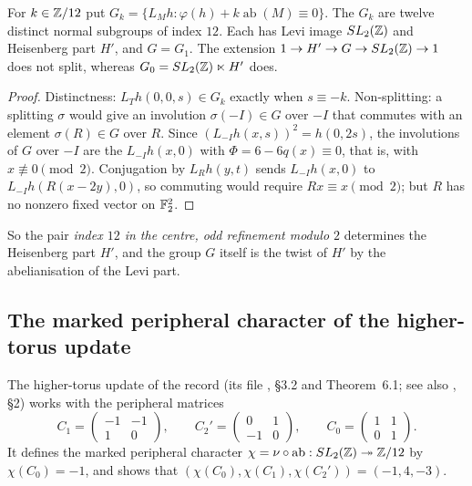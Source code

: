\begin{proposition}\label{prop:twist}
For $k\in\mathbb{Z}/12$ put $G_k=\{L_Mh:\varphi(h)+k\operatorname{ab}(M)\equiv0\}$. The $G_k$ are twelve distinct normal subgroups of index $12$. Each has Levi image $SL_2(\mathbb{Z})$ and Heisenberg part $H'$, and $G=G_1$. The extension $1\to H'\to G\to SL_2(\mathbb{Z})\to1$ does not split, whereas $G_0=SL_2(\mathbb{Z})\ltimes H'$ does.
\end{proposition}
\begin{proof}
Distinctness: $L_Th(0,0,s)\in G_k$ exactly when $s\equiv-k$. Non-splitting: a splitting $\sigma$ would give an involution $\sigma(-I)\in G$ over $-I$ that commutes with an element $\sigma(R)\in G$ over $R$. Since $(L_{-I}h(x,s))^2=h(0,2s)$, the involutions of $G$ over $-I$ are the $L_{-I}h(x,0)$ with $\Phi=6-6q(x)\equiv0$, that is, with $x\not\equiv0\pmod2$. Conjugation by $L_Rh(y,t)$ sends $L_{-I}h(x,0)$ to $L_{-I}h(R(x-2y),0)$, so commuting would require $Rx\equiv x\pmod2$; but $R$ has no nonzero fixed vector on $\mathbb{F}_2^2$.
\end{proof}

So the pair \emph{index $12$ in the centre, odd refinement modulo $2$} determines the Heisenberg part $H'$, and the group $G$ itself is the twist of $H'$ by the abelianisation of the Levi part.

\subsection{The marked peripheral character of the higher-torus update}

The higher-torus update of the record (its file , §3.2 and Theorem~6.1; see also , §2) works with the peripheral matrices
\[
C_1=\begin{pmatrix}-1&-1\\1&0\end{pmatrix},\qquad C_2'=\begin{pmatrix}0&1\\-1&0\end{pmatrix},\qquad C_0=\begin{pmatrix}1&1\\0&1\end{pmatrix}.
\]
It defines the marked peripheral character $\chi=\nu\circ\operatorname{ab}:SL_2(\mathbb{Z})\twoheadrightarrow\mathbb{Z}/12$ by $\chi(C_0)=-1$, and shows that $(\chi(C_0),\chi(C_1),\chi(C_2'))=(-1,4,-3)$.


